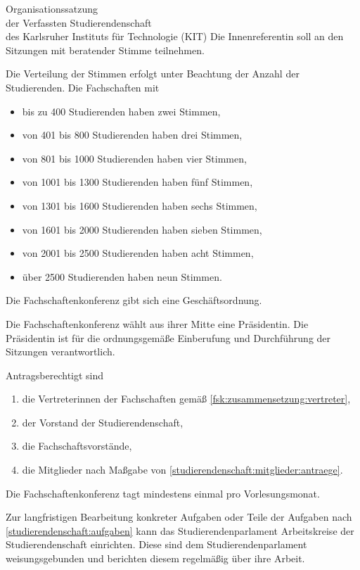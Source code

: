 \begin{jurdoc}[Organisationssatzung]{Organisationssatzung\\der Verfassten Studierendenschaft\\des Karlsruher Instituts für Technologie (KIT)}
Die Innenreferentin soll an den Sitzungen mit beratender Stimme teilnehmen.

Die Verteilung der Stimmen erfolgt unter Beachtung der Anzahl der Studierenden. Die Fachschaften mit
\begin{itemize}
\item bis zu 400 Studierenden haben zwei Stimmen,
\item von 401 bis 800 Studierenden haben drei Stimmen,
\item von 801 bis 1000 Studierenden haben vier Stimmen,
\item von 1001 bis 1300 Studierenden haben fünf Stimmen,
\item von 1301 bis 1600 Studierenden haben sechs Stimmen,
\item von 1601 bis 2000 Studierenden haben sieben Stimmen,
\item von 2001 bis 2500 Studierenden haben acht Stimmen,
\item über 2500 Studierenden haben neun Stimmen.
\end{itemize}

\label{fsk:organisation}

Die Fachschaftenkonferenz gibt sich eine Geschäftsordnung.

Die Fachschaftenkonferenz wählt aus ihrer Mitte eine Präsidentin. Die Präsidentin ist für die ordnungsgemäße Einberufung und Durchführung der Sitzungen verantwortlich.

Antragsberechtigt sind
  \begin{enumerate}
  \item die Vertreterinnen der Fachschaften gemäß \ref{fsk:zusammensetzung:vertreter},
  \item der Vorstand der Studierendenschaft,
  \item die Fachschaftsvorstände,
  \item die Mitglieder nach Maßgabe von \ref{studierendenschaft:mitglieder:antraege}.
  \end{enumerate}

Die Fachschaftenkonferenz tagt mindestens einmal pro Vorlesungsmonat.

%
%


Zur langfristigen Bearbeitung konkreter Aufgaben oder Teile der Aufgaben nach \ref{studierendenschaft:aufgaben} kann das Studierendenparlament Arbeitskreise der Studierendenschaft einrichten. Diese sind dem Studierendenparlament weisungsgebunden und berichten diesem regelmäßig über ihre Arbeit.


\end{jurdoc}
